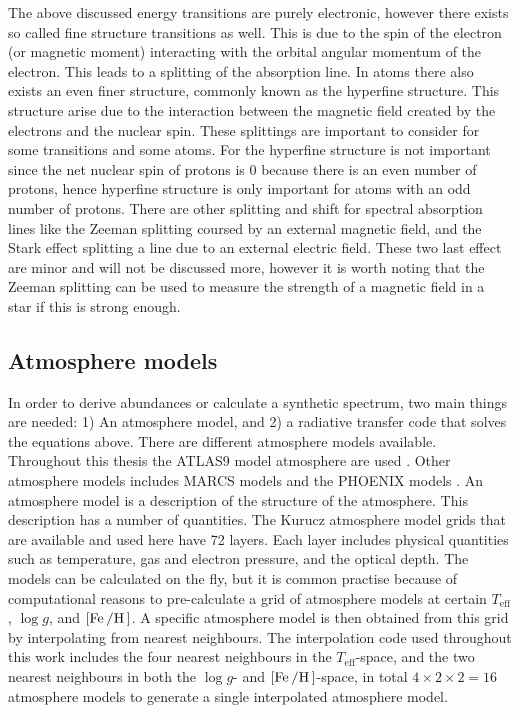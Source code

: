 {The above discussed energy transitions are purely electronic, however there exists so called fine
structure transitions as well. This is due to the spin of the electron (or magnetic moment)
interacting with the orbital angular momentum of the electron. This leads to a splitting of the
absorption line. In atoms there also exists an even finer structure, commonly known as the hyperfine
structure. This structure arise due to the interaction between the magnetic field created by the
electrons and the nuclear spin. These splittings are important to consider for some transitions and
some atoms. For  the hyperfine structure is not important since the net nuclear spin of
protons is 0 because there is an even number of protons, hence hyperfine structure is only important
for atoms with an odd number of protons. There are other splitting and shift for spectral absorption
lines like the Zeeman splitting coursed by an external magnetic field, and the Stark effect
splitting a line due to an external electric field. These two last effect are minor and will not be
discussed more, however it is worth noting that the Zeeman splitting can be used to measure the
strength of a magnetic field in a star if this is strong enough.



\subsection{Atmosphere models}
\label{sec:atmospheremodels}

In order to derive abundances or calculate a synthetic spectrum, two main things are needed: 1) An
atmosphere model, and 2) a radiative transfer code that solves the equations above. There are
different atmosphere models available. Throughout this thesis the ATLAS9 model atmosphere are used
\citep{Kurucz1993}. Other atmosphere models includes MARCS models \citep{Gustafson2008} and the
PHOENIX models \citep{Husser2013}. An atmosphere model is a description of the structure of the
atmosphere. This description has a number of quantities. The Kurucz atmosphere model grids that are
available and used here have 72 layers. Each layer includes physical quantities such as temperature,
gas and electron pressure, and the optical depth. The models can be calculated on the fly, but it is
common practise because of computational reasons to pre-calculate a grid of atmosphere models at
certain $T_\mathrm{eff}$, $\log g$, and $[\ion{Fe}/\ion{H}]$. A specific atmosphere model is then
obtained from this grid by interpolating from nearest neighbours. The interpolation code used
throughout this work includes the four nearest neighbours in the $T_\mathrm{eff}$-space, and the two
nearest neighbours in both the $\log g$- and $[\ion{Fe}/\ion{H}]$-space, in total
$4\times2\times2=16$ atmosphere models to generate a single interpolated atmosphere model.



}
